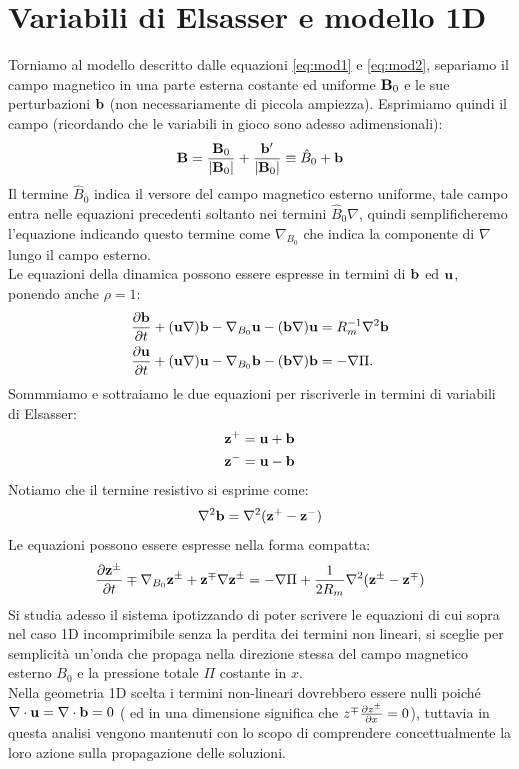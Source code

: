 \section{Variabili di Elsasser e modello 1D}
Torniamo al modello descritto dalle equazioni \ref{eq:mod1} e \ref{eq:mod2}, separiamo il campo magnetico in una parte esterna costante ed uniforme $\vv{B}_0$ e le sue perturbazioni $\vv{b}$ (non necessariamente di piccola ampiezza). Esprimiamo quindi il campo (ricordando che le variabili in gioco sono adesso adimensionali): 
\[
    \vv{B} = \frac{\vv{B}_0}{\left|\vv{B}_0\right|} + \frac{\vv{b'}}{\left|\vv{B}_0\right|} \equiv \hat{B}_0 + \vv{b}
\]
Il termine $\hat{B}_0$ indica il versore del campo magnetico esterno uniforme, tale campo entra nelle equazioni precedenti soltanto nei termini $\hat{B}_0 \nabla$, quindi semplificheremo l'equazione indicando questo termine come $\nabla_{B_0}$ che indica la componente di $\nabla$ lungo il campo esterno.\\
Le equazioni della dinamica possono essere espresse in termini di $\vv{b}$ ed $\vv{u}$, ponendo anche $\rho = 1$:
\begin{align}
     & \pd{\vv{b}}  + (\vv{u}\nabla) \vv{b} - \nabla_{B_0} \vv{u} - (\vv{b} \nabla) \vv{u} = R_m^{-1} \nabla^2 \vv{b} \label{eq:init_elsa1}\\
     & \pd{\vv{u}}  + (\vv{u}\nabla) \vv{u} - \nabla_{B_0} \vv{b} - (\vv{b} \nabla) \vv{b} = -\nabla \Pi. \label{eq:init_elsa2}
\end{align}
Sommmiamo e sottraiamo le due equazioni per riscriverle in termini di variabili di Elsasser:
\begin{align*}
    &\vv{z}^+ = \vv{u} + \vv{b} \\
    &\vv{z}^- = \vv{u} - \vv{b} 
\end{align*}
Notiamo che il termine resistivo si esprime come:
\[
    \nabla^2 \vv{b} = \nabla^2 (\vv{z}^+ - \vv{z}^-)
\]
Le equazioni possono essere espresse nella forma compatta:
\[
    \pd{\vv{z}^{\pm}} \mp \nabla_{B_0} \vv{z}^{\pm} + \vv{z}^{\mp} \nabla \vv{z}^{\pm} = -\nabla \Pi + \frac{1}{2R_m} \nabla^2 (\vv{z}^{\pm} - \vv{z}^{\mp})
\]
Si studia adesso il sistema ipotizzando di poter scrivere le equazioni di cui sopra nel caso 1D incomprimibile senza la perdita dei termini non lineari, si sceglie per semplicità un'onda che propaga nella direzione stessa del campo magnetico esterno $B_0$ e la pressione totale $\Pi$ costante in $x$.\\
Nella geometria 1D scelta i termini non-lineari dovrebbero essere nulli poiché $\nabla \cdot \vv{u} = \nabla \cdot \vv{b} = 0$ ( ed in una dimensione significa che $z^{\mp} \frac{\partial z^{\pm}}{\partial x} = 0$), tuttavia in questa analisi vengono mantenuti con lo scopo di comprendere concettualmente la loro azione sulla propagazione delle soluzioni. \\

